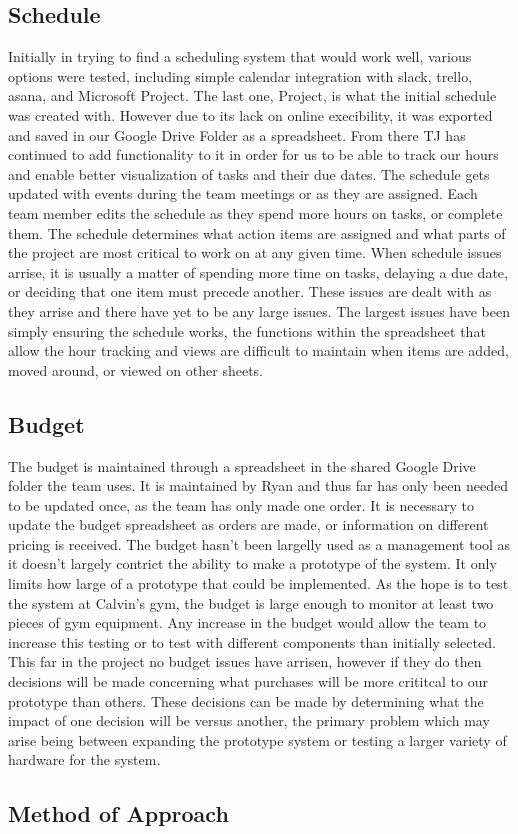 \documentclass[ppfs.tex]{template/subfiles}
\begin{document}
    \subsection{Schedule}
	Initially in trying to find a scheduling system that would work well, various options were tested, including simple calendar integration with slack, trello, asana, and Microsoft Project. The last one, Project, is what the initial schedule was created with. However due to its lack on online execibility, it was exported and saved in our Google Drive Folder as a spreadsheet. From there TJ has continued to add functionality to it in order for us to be able to track our hours and enable better visualization of tasks and their due dates. The schedule gets updated with events during the team meetings or as they are assigned. Each team member edits the schedule as they spend more hours on tasks, or complete them. The schedule determines what action items are assigned and what parts of the project are most critical to work on at any given time. When schedule issues arrise, it is usually a matter of spending more time on tasks, delaying a due date, or deciding that one item must precede another. These issues are dealt with as they arrise and there have yet to be any large issues. The largest issues have been simply ensuring the schedule works, the functions within the spreadsheet that allow the hour tracking and views are difficult to maintain when items are added, moved around, or viewed on other sheets. 
	
    \subsection{Budget}
    The budget is maintained through a spreadsheet in the shared Google Drive folder the team uses. It is maintained by Ryan and thus far has only been needed to be updated once, as the team has only made one order. It is necessary to update the budget spreadsheet as orders are made, or information on different pricing is received. The budget hasn't been largelly used as a management tool as it doesn't largely contrict the ability to make a prototype of the system. It only limits how large of a prototype that could be implemented. As the hope is to test the system at Calvin's gym, the budget is large enough to monitor at least two pieces of gym equipment. Any increase in the budget would allow the team to increase this testing or to test with different components than initially selected. This far in the project no budget issues have arrisen, however if they do then decisions will be made concerning what purchases will be more crititcal to our prototype than others. These decisions can be made by determining what the impact of one decision will be versus another, the primary problem which may arise being between expanding the prototype system or testing a larger variety of hardware for the system. 
	
	\subsection{Method of Approach}

	
\end{document}
